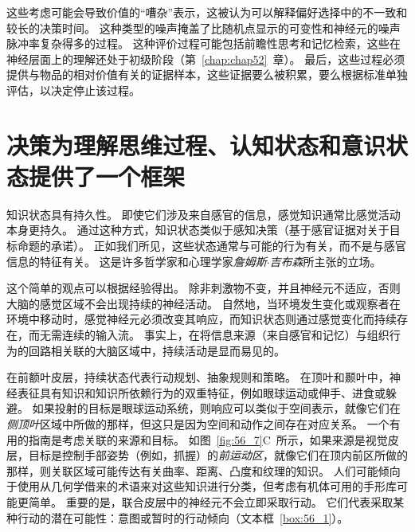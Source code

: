 这些考虑可能会导致价值的“嘈杂”表示，这被认为可以解释偏好选择中的不一致和较长的决策时间。
这种类型的噪声掩盖了比随机点显示的可变性和神经元的噪声脉冲率复杂得多的过程。
这种评价过程可能包括前瞻性思考和记忆检索，这些在神经层面上的理解还处于初级阶段（第~\ref{chap:chap52}~章）。
最后，这些过程必须提供与物品的相对价值有关的证据样本，这些证据要么被积累，要么根据标准单独评估，以决定停止该过程。



\section{决策为理解思维过程、认知状态和意识状态提供了一个框架}

知识状态具有持久性。
即使它们涉及来自感官的信息，感觉知识通常比感觉活动本身更持久。
通过这种方式，知识状态类似于感知决策（基于感官证据对关于目标命题的承诺）。
正如我们所见，这些状态通常与可能的行为有关，而不是与感官信息的特征有关。
这是许多哲学家和心理学家\textit{詹姆斯$\cdot$吉布森}所主张的立场。


这个简单的观点可以根据经验得出。
除非刺激物不变，并且神经元不适应，否则大脑的感觉区域不会出现持续的神经活动。
自然地，当环境发生变化或观察者在环境中移动时，感觉神经元必须改变其响应，而知识状态则通过感觉变化而持续存在，而无需连续的输入流。
事实上，在将信息来源（来自感官和记忆）与组织行为的回路相关联的大脑区域中，持续活动是显而易见的。


在前额叶皮层，持续状态代表行动规划、抽象规则和策略。
在顶叶和颞叶中，神经表征具有知识和知识所依赖行为的双重特征，例如眼球运动或伸手、进食或躲避。
如果投射的目标是眼球运动系统，则响应可以类似于空间表示，就像它们在\textit{侧顶叶}区域中所做的那样，但这只是因为空间和动作之间存在对应关系。
一个有用的指南是考虑关联的来源和目标。
如图~\ref{fig:56_7}C~所示，如果来源是视觉皮层，目标是控制手部姿势（例如，抓握）的\textit{前运动区}，就像它们在顶内前区所做的那样，则关联区域可能传达有关曲率、距离、凸度和纹理的知识。
人们可能倾向于使用从几何学借来的术语来对这些知识进行分类，但考虑有机体可用的手形库可能更简单。
重要的是，联合皮层中的神经元不会立即采取行动。
它们代表采取某种行动的潜在可能性：意图或暂时的行动倾向（文本框~\ref{box:56_1}）。


